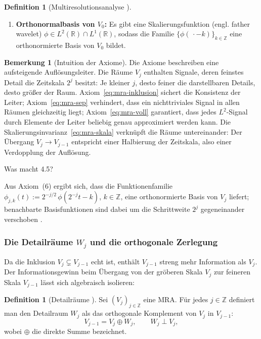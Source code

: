 \documentclass[a4paper,11pt,bibliography=totoc,listof=totoc,headinclude=true,cleardoublepage=empty,oneside]{scrbook}
\theoremstyle{definition}
\newtheorem{definition}[theorem]{Definition}
\newtheorem{bemerkung}[theorem]{Bemerkung}
\theoremstyle{remark}
\begin{document}
\begin{definition}[Multiresolutionsanalyse {\cite[S.\,106]{blatterWaveletsEinfuhrung2003}}]
\begin{enumerate}
     \item \textbf{Orthonormalbasis von $V_0$:}
       Es gibt eine Skalierungsfunktion (engl. father wavelet) $\phi \in L^2(\mathbb{R}) \cap L^1(\mathbb{R})$,
       sodass die Familie $\{\phi(\,\cdot - k)\}_{k \in \mathbb{Z}}$ eine
       orthonormierte Basis von $V_0$ bildet.
   \end{enumerate}
   \end{definition}
   
   \begin{bemerkung}[Intuition der Axiome]
   Die Axiome beschreiben eine aufsteigende Auflösungsleiter.
   Die Räume $V_j$ enthalten Signale, deren feinstes Detail die
   Zeitskala $2^j$ besitzt: Je kleiner $j$, desto feiner die
   darstellbaren Details, desto größer der Raum.
   Axiom~\eqref{eq:mra-inklusion} sichert die Konsistenz der Leiter;
   Axiom~\eqref{eq:mra-sep} verhindert, dass ein nichttriviales Signal
   in allen Räumen gleichzeitig liegt; Axiom~\eqref{eq:mra-voll}
   garantiert, dass jedes $L^2$-Signal durch Elemente der Leiter
   beliebig genau approximiert werden kann.
   Die Skalierungsinvarianz~\eqref{eq:mra-skala} verknüpft die Räume
   untereinander: Der Übergang $V_j \to V_{j-1}$ entspricht einer
   Halbierung der Zeitskala, also einer Verdopplung der Auflösung.

   Was macht 4.5?
   \end{bemerkung}
   
   Aus Axiom~(6) ergibt sich, dass die Funktionenfamilie
   $\phi_{j,k}(t) := 2^{-j/2}\,\phi(2^{-j}t - k)$, $k \in \mathbb{Z}$,
   eine orthonormierte Basis von $V_j$ liefert; benachbarte Basisfunktionen
   sind dabei um die Schrittweite $2^j$ gegeneinander verschoben
   \cite[S.\,107]{blatterWaveletsEinfuhrung2003}.

   \subsubsection{Die Detailräume $W_j$ und die orthogonale Zerlegung}
   \label{sec:mra-wj}
   
   Da die Inklusion $V_j \subsetneq V_{j-1}$ echt ist, enthält
   $V_{j-1}$ streng mehr Information als $V_j$.
   Der Informationsgewinn beim Übergang von der gröberen Skala $V_j$
   zur feineren Skala $V_{j-1}$ lässt sich algebraisch isolieren:
   
   \begin{definition}[Detailräume {\cite[S.\,107]{blatterWaveletsEinfuhrung2003}}]
   \label{def:wj}
   Sei $(V_j)_{j\in\mathbb{Z}}$ eine MRA. Für jedes $j \in \mathbb{Z}$
   definiert man den Detailraum $W_j$ als das orthogonale
   Komplement von $V_j$ in $V_{j-1}$:
   \begin{equation}
     \label{eq:def-wj}
     V_{j-1} = V_j \oplus W_j, \qquad W_j \perp V_j,
   \end{equation}
   wobei $\oplus$ die direkte Summe bezeichnet.
   \end{definition}
   
\end{document}
